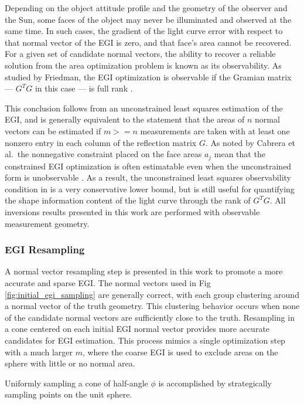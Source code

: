 Depending on the object attitude profile and the geometry of the observer and the Sun, some faces of the object may never be illuminated and observed at the same time. In such cases, the gradient of the light curve error with respect to that normal vector of the EGI is zero, and that face's area cannot be recovered. For a given set of candidate normal vectors, the ability to recover a reliable solution from the area optimization problem is known as its observability. As studied by Friedman, the EGI optimization is observable if the Gramian matrix --- $G^T G$ in this case --- is full rank \cite{friedman2020}.

This conclusion follows from an unconstrained least squares estimation of the EGI, and is generally equivalent to the statement that the areas of $n$ normal vectors can be estimated if $m>=n$ measurements are taken with at least one nonzero entry in each column of the reflection matrix $G$. As noted by Cabrera et al.\, the nonnegative constraint placed on the face areas $a_j$ mean that the constrained EGI optimization is often estimatable even when the unconstrained form is unobservable \cite{cabrera2021}. As a result, the unconstrained least squares observability condition in is a very conservative lower bound, but is still useful for quantifying the shape information content of the light curve through the rank of $G^T G$. All inversions results presented in this work are performed with observable measurement geometry. 

\subsubsection{EGI Resampling}

A normal vector resampling step is presented in this work to promote a more accurate and sparse EGI. The normal vectors used in Fig \ref{fig:initial_egi_sampling} are generally correct, with each group clustering around a normal vector of the truth geometry. This clustering behavior occurs when none of the candidate normal vectors are sufficiently close to the truth. Resampling in a cone centered on each initial EGI normal vector provides more accurate candidates for EGI estimation. This process mimics a single optimization step with a much larger $m$, where the coarse EGI is used to exclude areas on the sphere with little or no normal area.

Uniformly sampling a cone of half-angle $\phi$ is accomplished by strategically sampling points on the unit sphere. 

